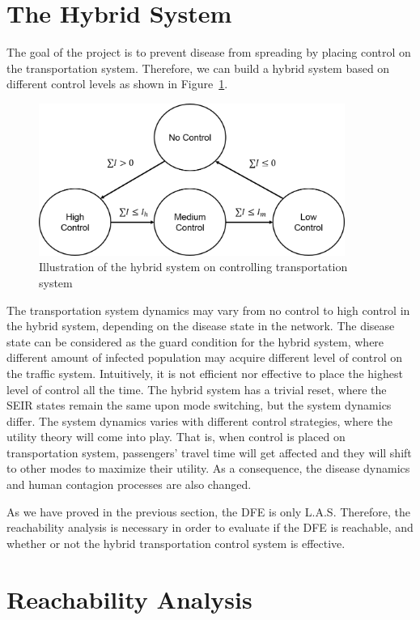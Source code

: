 \documentclass[review]{elsarticle}
\theoremstyle{plain}
\theoremstyle{definition}
\theoremstyle{remark}
\numberwithin{equation}{section}
\theoremstyle{remark}
\begin{document}
\section{The Hybrid System}
The goal of the project is to prevent disease from spreading by placing control on the transportation system. Therefore, we can build a hybrid system based on different control levels as shown in Figure~\ref{fig:hybrid}.
\begin{figure}[h]
	\centering
	\includegraphics[width=100mm]{hybrid.png}
	\caption{Illustration of the hybrid system on controlling transportation system}
	\label{fig:hybrid}
\end{figure}

The transportation system dynamics may vary from no control to high control in the hybrid system, depending on the disease state in the network. The disease state can be considered as the guard condition for the hybrid system, where different amount of infected population may acquire different level of control on the traffic system. Intuitively, it is not efficient nor effective to place the highest level of control all the time. The hybrid system has a trivial reset, where the SEIR states remain the same upon mode switching, but the system dynamics differ. The system dynamics varies with different control strategies, where the utility theory will come into play. That is, when control is placed on transportation system, passengers' travel time will get affected and they will shift to other modes to maximize their utility. As a consequence, the disease dynamics and human contagion processes are also changed. 

As we have proved in the previous section, the DFE is only L.A.S. Therefore, the reachability analysis is necessary in order to evaluate if the DFE is reachable, and whether or not the hybrid transportation control system is effective. 

\section{Reachability Analysis}
\end{document}
